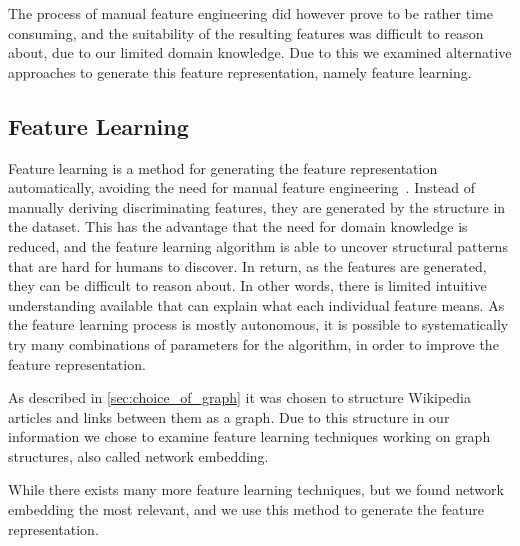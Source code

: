 The process of manual feature engineering did however prove to be rather time consuming, and the suitability of the resulting features was difficult to reason about, due to our limited domain knowledge. Due to this we examined alternative approaches to generate this feature representation, namely feature learning.

\subsection{Feature Learning}
Feature learning is a method for generating the feature representation automatically, avoiding the need for manual feature engineering~\cite{ng-lecture}. Instead of manually deriving discriminating features, they are generated by the structure in the dataset. This has the advantage that the need for domain knowledge is reduced, and the feature learning algorithm is able to uncover structural patterns that are hard for humans to discover. In return, as the features are generated, they can be difficult to reason about. In other words, there is limited intuitive understanding available that can explain what each individual feature means. As the feature learning process is mostly autonomous, it is possible to systematically try many combinations of parameters for the algorithm, in order to improve the feature representation.

As described in \cref{sec:choice_of_graph} it was chosen to structure Wikipedia articles and links between them as a graph. Due to this structure in our information we chose to examine feature learning techniques working on graph structures, also called network embedding.

While there exists many more feature learning techniques, but we found network embedding the most relevant, and we use this method to generate the feature representation.

